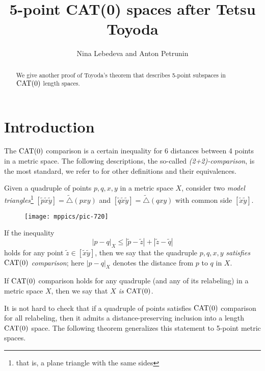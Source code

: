 \documentclass{article}
\begin{document}


\title{5-point CAT(0) spaces after Tetsu Toyoda}
\author{Nina Lebedeva and Anton Petrunin}
\date{}
\maketitle
\begin{abstract}
We give another proof of Toyoda's theorem that describes 5-point subspaces in $\mathrm{CAT}(0)$ length spaces.
\end{abstract}


\section{Introduction}

The $\mathrm{CAT}(0)$ comparison is a certain inequality for 6 distances between 4 points in a metric space.
The following descriptions, the so-called \emph{(2+2)-comparison}, is the most standard,
we refer to \cite{alexander-kapovitch-petrunin-2019,alexander-kapovitch-petrunin-2021} for other definitions and their equivalences.

Given a quadruple of points $p,q,x,y$ in a metric space $X$,
consider two \emph{model triangles}\footnote{that is, a plane triangle with the same sides}
$[\tilde p\tilde x\tilde y]=\tilde\triangle(pxy)$ 
and 
$[\tilde q\tilde x\tilde y]=\tilde\triangle(qxy)$ with common side $[\tilde x\tilde y]$.

\begin{wrapfigure}{r}{25mm}
\vskip-4mm
\centering
\texttt{[image: mppics/pic-720]}
\end{wrapfigure}

If the inequality
\[|p-q|_X\le |\tilde p-\tilde z|+|\tilde z-\tilde q|\]
holds for any point $\tilde z\in [\tilde x\tilde y]$, then we say that 
the quadruple $p,q,x,y$ \emph{satisfies $\mathrm{CAT}(0)$ comparison};
here $|p-q|_X$ denotes the distance from $p$ to $q$ in $X$.

If $\mathrm{CAT}(0)$ comparison holds for any quadruple (and any of its relabeling) in a metric space $X$,
then we say that \emph{$X$ is $\mathrm{CAT}(0)$}.


It is not hard to check that if a quadruple of points satisfies $\mathrm{CAT}(0)$ comparison for all relabeling,
then it admits a distance-preserving inclusion into a length $\mathrm{CAT}(0)$ space.
The following theorem generalizes this statement to 5-point metric spaces.
\end{document}
